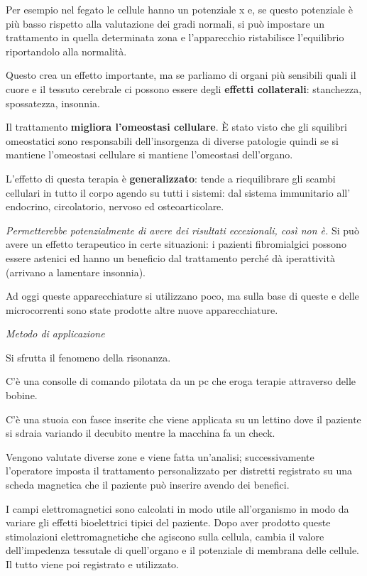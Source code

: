 \documentclass[]{article}
\begin{document}
Per esempio nel fegato le cellule hanno un potenziale x e, se questo
potenziale è più basso rispetto alla valutazione dei gradi normali, si
può impostare un trattamento in quella determinata zona e l'apparecchio
ristabilisce l'equilibrio riportandolo alla normalità.

Questo crea un effetto importante, ma se parliamo di organi più
sensibili quali il cuore e il tessuto cerebrale ci possono essere degli
\textbf{effetti collaterali}: stanchezza, spossatezza, insonnia.

Il trattamento \textbf{migliora l'omeostasi cellulare}. È stato visto
che gli squilibri omeostatici sono responsabili dell'insorgenza di
diverse patologie quindi se si mantiene l'omeostasi cellulare si
mantiene l'omeostasi dell'organo.

L'effetto di questa terapia è \textbf{generalizzato}: tende a
riequilibrare gli scambi cellulari in tutto il corpo agendo su tutti i
sistemi: dal sistema immunitario all' endocrino, circolatorio, nervoso
ed osteoarticolare.

\emph{Permetterebbe potenzialmente di avere dei risultati eccezionali,
così non è.} Si può avere un effetto terapeutico in certe situazioni: i
pazienti fibromialgici possono essere astenici ed hanno un beneficio dal
trattamento perché dà iperattività (arrivano a lamentare insonnia).

Ad oggi queste apparecchiature si utilizzano poco, ma sulla base di
queste e delle microcorrenti sono state prodotte altre nuove
apparecchiature.

\emph{Metodo di applicazione}

Si sfrutta il fenomeno della risonanza.

C'è una consolle di comando pilotata da un pc che eroga terapie
attraverso delle bobine.

C'è una stuoia con fasce inserite che viene applicata su un lettino dove
il paziente si sdraia variando il decubito mentre la macchina fa un
check.

Vengono valutate diverse zone e viene fatta un'analisi; successivamente
l'operatore imposta il trattamento personalizzato per distretti
registrato su una scheda magnetica che il paziente può inserire avendo
dei benefici.

I campi elettromagnetici sono calcolati in modo utile all'organismo in
modo da variare gli effetti bioelettrici tipici del paziente. Dopo aver
prodotto queste stimolazioni elettromagnetiche che agiscono sulla
cellula, cambia il valore dell'impedenza tessutale di quell'organo e il
potenziale di membrana delle cellule. Il tutto viene poi registrato e
utilizzato.
\end{document}
